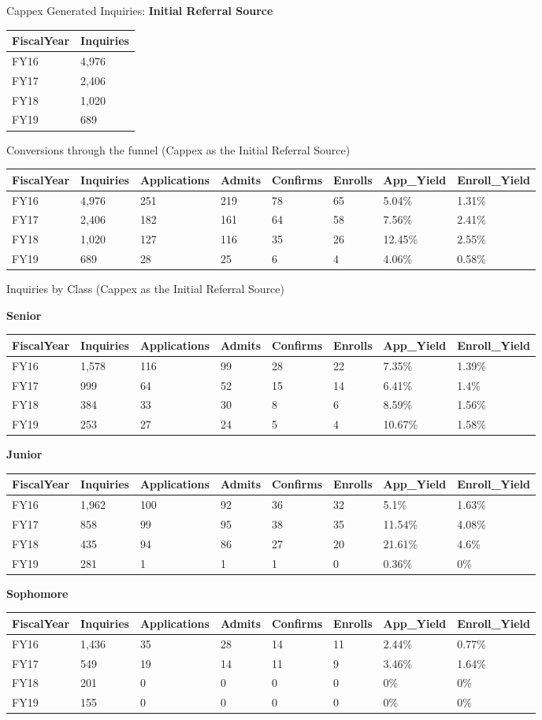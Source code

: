 \documentclass[]{article}
\begin{document}
Cappex Generated Inquiries: \textbf{Initial Referral Source}

\begin{longtable}[]{@{}ll@{}}
\toprule
FiscalYear & Inquiries\tabularnewline
\midrule
\endhead
FY16 & 4,976\tabularnewline
FY17 & 2,406\tabularnewline
FY18 & 1,020\tabularnewline
FY19 & 689\tabularnewline
\bottomrule
\end{longtable}

Conversions through the funnel (Cappex as the Initial Referral Source)

\begin{longtable}[]{@{}llllllll@{}}
\toprule
FiscalYear & Inquiries & Applications & Admits & Confirms & Enrolls &
App\_Yield & Enroll\_Yield\tabularnewline
\midrule
\endhead
FY16 & 4,976 & 251 & 219 & 78 & 65 & 5.04\% & 1.31\%\tabularnewline
FY17 & 2,406 & 182 & 161 & 64 & 58 & 7.56\% & 2.41\%\tabularnewline
FY18 & 1,020 & 127 & 116 & 35 & 26 & 12.45\% & 2.55\%\tabularnewline
FY19 & 689 & 28 & 25 & 6 & 4 & 4.06\% & 0.58\%\tabularnewline
\bottomrule
\end{longtable}

Inquiries by Class (Cappex as the Initial Referral Source)

\textbf{Senior}

\begin{longtable}[]{@{}llllllll@{}}
\toprule
FiscalYear & Inquiries & Applications & Admits & Confirms & Enrolls &
App\_Yield & Enroll\_Yield\tabularnewline
\midrule
\endhead
FY16 & 1,578 & 116 & 99 & 28 & 22 & 7.35\% & 1.39\%\tabularnewline
FY17 & 999 & 64 & 52 & 15 & 14 & 6.41\% & 1.4\%\tabularnewline
FY18 & 384 & 33 & 30 & 8 & 6 & 8.59\% & 1.56\%\tabularnewline
FY19 & 253 & 27 & 24 & 5 & 4 & 10.67\% & 1.58\%\tabularnewline
\bottomrule
\end{longtable}

\textbf{Junior}

\begin{longtable}[]{@{}llllllll@{}}
\toprule
FiscalYear & Inquiries & Applications & Admits & Confirms & Enrolls &
App\_Yield & Enroll\_Yield\tabularnewline
\midrule
\endhead
FY16 & 1,962 & 100 & 92 & 36 & 32 & 5.1\% & 1.63\%\tabularnewline
FY17 & 858 & 99 & 95 & 38 & 35 & 11.54\% & 4.08\%\tabularnewline
FY18 & 435 & 94 & 86 & 27 & 20 & 21.61\% & 4.6\%\tabularnewline
FY19 & 281 & 1 & 1 & 1 & 0 & 0.36\% & 0\%\tabularnewline
\bottomrule
\end{longtable}

\textbf{Sophomore}

\begin{longtable}[]{@{}llllllll@{}}
\toprule
FiscalYear & Inquiries & Applications & Admits & Confirms & Enrolls &
App\_Yield & Enroll\_Yield\tabularnewline
\midrule
\endhead
FY16 & 1,436 & 35 & 28 & 14 & 11 & 2.44\% & 0.77\%\tabularnewline
FY17 & 549 & 19 & 14 & 11 & 9 & 3.46\% & 1.64\%\tabularnewline
FY18 & 201 & 0 & 0 & 0 & 0 & 0\% & 0\%\tabularnewline
FY19 & 155 & 0 & 0 & 0 & 0 & 0\% & 0\%\tabularnewline
\bottomrule
\end{longtable}
\end{document}
